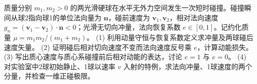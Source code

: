 质量分别 \(m_1,m_2>0\) 的两光滑硬球在水平无外力空间发生一次短时碰撞。碰撞瞬间从球2指向球1的单位法向量为 \(\mathbf n\)，碰前速度为 \(\mathbf v_1,\mathbf v_2\)，相对法向速度 \(g_n=(\mathbf v_1-\mathbf v_2)\cdot\mathbf n<0\)；光滑无切向冲量，法向恢复系数 \(e\in[0,1]\)。记约化质量 \(\mu=m_1m_2/(m_1+m_2)\)。
(1) 利用动量守恒与恢复系数定义求冲量及两球碰后速度矢量。
(2) 证明碰后相对切向速度不变而法向速度反号乘 \(e\)，计算动能损失。
(3) 写出质心速度与质心系碰撞前后相对动能的表达，讨论 \(e=1\) 与 \(e=0\)。
(4) 对实验室中2球初始静止、1球以速率 \(v\) 入射的特例，求法向冲量、1球速度的两个分量，并检查一维正碰极限。
